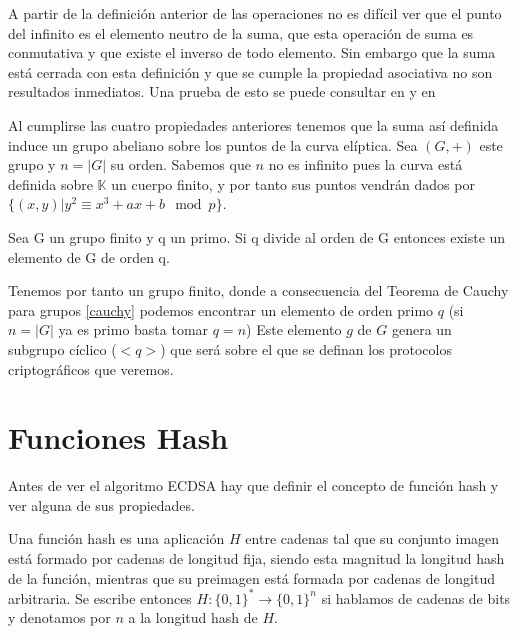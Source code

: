 A partir de la definición anterior de las operaciones no es difícil ver que el punto del infinito es el elemento neutro de la suma, que esta operación de suma es conmutativa y que existe el inverso de todo elemento. Sin embargo que la suma está cerrada con esta definición y que se cumple la propiedad asociativa no son resultados inmediatos. Una prueba de esto se puede consultar en \citep{group_law} y en \citep{group_law_verrill} 

Al cumplirse las cuatro propiedades anteriores tenemos que la suma así definida induce un grupo abeliano sobre los puntos de la curva elíptica. Sea $(G,+)$ este grupo y $n=|G|$ su orden. Sabemos que $n$ no es infinito pues la curva está definida sobre $\mathbb{K}$ un cuerpo finito, y por tanto sus puntos vendrán dados por $\{(x,y)| y^2 \equiv x^3 + ax + b  \mod p \}$. 
\theoremstyle{theorem}\begin{theorem}\label{cauchy} Sea G un grupo finito y q un primo. Si q divide al orden de G entonces existe un elemento de G de orden q.
\end{theorem}
Tenemos por tanto un grupo finito, donde a consecuencia del Teorema de Cauchy para grupos \ref{cauchy} podemos encontrar un elemento de orden primo $q$ (si $n = |G|$ ya es primo basta tomar $q = n$) Este elemento $g$ de $G$ genera un subgrupo cíclico ($<q>$) que será sobre el que se definan los protocolos criptográficos que veremos.



\section{Funciones Hash}\label{hash}
Antes de ver el algoritmo ECDSA hay que definir el concepto de función hash y ver alguna de sus propiedades.
\theoremstyle{definition}\begin{definition}\label{hash_def} Una función hash es una aplicación $\textit{H}$ entre cadenas tal que su conjunto imagen está formado por cadenas de longitud fija, siendo esta magnitud la longitud hash de la función, mientras que su preimagen está formada por cadenas de longitud arbitraria. Se escribe entonces $\textit{H}: \{0,1\}^* \rightarrow \{0,1\}^n$ si hablamos de cadenas de bits y denotamos por $n$ a la longitud hash de $\textit{H}$.\end{definition}

